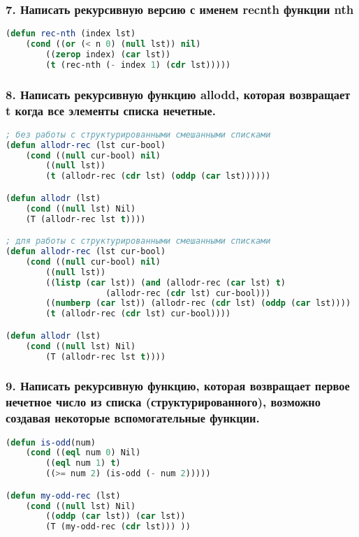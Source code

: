 \newpage
\subsubsection*{7. Написать рекурсивную версию с именем recnth функции nth}
\begin{lstlisting}[language=Lisp]
(defun rec-nth (index lst)
	(cond ((or (< n 0) (null lst)) nil)
		((zerop index) (car lst))
		(t (rec-nth (- index 1) (cdr lst)))))
\end{lstlisting}


\subsubsection*{8. Написать рекурсивную функцию allodd, которая возвращает t когда все элементы списка	нечетные.}
\begin{lstlisting}[language=Lisp]
; без работы с структурированными смешанными списками
(defun allodr-rec (lst cur-bool)
	(cond ((null cur-bool) nil)
		((null lst))
		(t (allodr-rec (cdr lst) (oddp (car lst))))))

(defun allodr (lst)
	(cond ((null lst) Nil)
	(T (allodr-rec lst t))))

; для работы с структурированными смешанными списками
(defun allodr-rec (lst cur-bool)
	(cond ((null cur-bool) nil)
		((null lst))
		((listp (car lst)) (and (allodr-rec (car lst) t) 
					(allodr-rec (cdr lst) cur-bool)))
		((numberp (car lst)) (allodr-rec (cdr lst) (oddp (car lst))))
		(t (allodr-rec (cdr lst) cur-bool))))

(defun allodr (lst)
	(cond ((null lst) Nil)
		(T (allodr-rec lst t))))
\end{lstlisting}

\newpage
\subsubsection*{9. Написать рекурсивную функцию, которая возвращает первое нечетное число из списка (структурированного), возможно создавая некоторые вспомогательные функции.}
\begin{lstlisting}[language=Lisp]
(defun is-odd(num)
	(cond ((eql num 0) Nil)
		((eql num 1) t)
		((>= num 2) (is-odd (- num 2)))))

(defun my-odd-rec (lst)
	(cond ((null lst) Nil)
		((oddp (car lst)) (car lst))
		(T (my-odd-rec (cdr lst))) ))
\end{lstlisting}

\newpage
